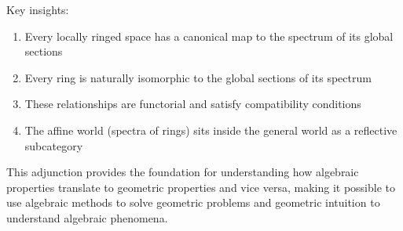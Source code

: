 \documentclass{article}
\theoremstyle{definition}
\begin{document}
Key insights:
\begin{enumerate}
\item Every locally ringed space has a canonical map to the spectrum of its global sections
\item Every ring is naturally isomorphic to the global sections of its spectrum  
\item These relationships are functorial and satisfy compatibility conditions
\item The affine world (spectra of rings) sits inside the general world as a reflective subcategory
\end{enumerate}

This adjunction provides the foundation for understanding how algebraic properties translate to geometric properties and vice versa, making it possible to use algebraic methods to solve geometric problems and geometric intuition to understand algebraic phenomena.
\end{document}
